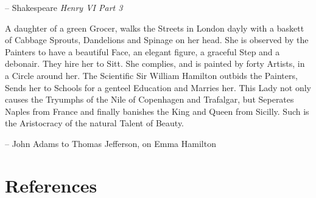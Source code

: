 \documentclass[
]{article}
\begin{document}
-- Shakespeare \emph{Henry VI Part 3}

A daughter of a green Grocer, walks the Streets in London dayly with a
baskett of Cabbage Sprouts, Dandelions and Spinage on her head. She is
observed by the Painters to have a beautiful Face, an elegant figure, a
graceful Step and a debonair. They hire her to Sitt. She complies, and
is painted by forty Artists, in a Circle around her. The Scientific Sir
William Hamilton outbids the Painters, Sends her to Schools for a
genteel Education and Marries her. This Lady not only causes the
Tryumphs of the Nile of Copenhagen and Trafalgar, but Seperates Naples
from France and finally banishes the King and Queen from Sicilly. Such
is the Aristocracy of the natural Talent of Beauty.

-- John Adams to Thomas Jefferson, on Emma Hamilton

\newpage

\hypertarget{references}{%
\section*{References}\label{references}}
\end{document}

